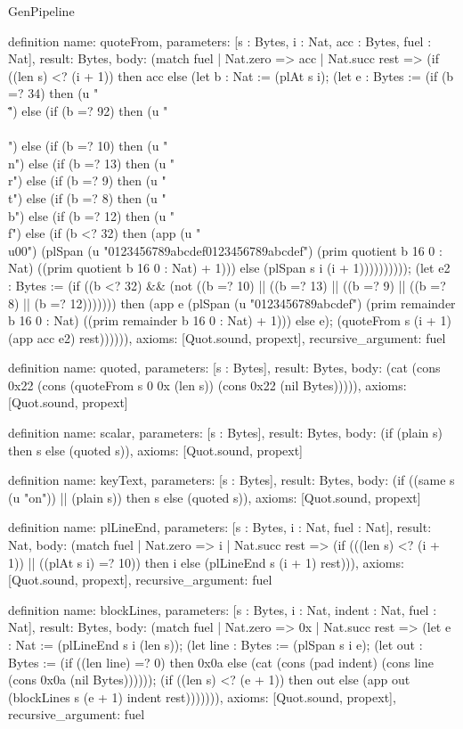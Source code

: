 \begin{lexlean}{GenPipeline}
\begin{semanticmodule}
definition{
  name: quoteFrom,
  parameters: [s : Bytes, i : Nat, acc : Bytes, fuel : Nat],
  result: Bytes,
  body: (match fuel
    | Nat.zero => acc
    | Nat.succ rest => (if ((len s) <? (i + 1)) then acc else (let b : Nat := (plAt s i); (let e : Bytes := (if (b =? 34) then (u "\\\"") else (if (b =? 92) then (u "\\\\") else (if (b =? 10) then (u "\\n") else (if (b =? 13) then (u "\\r") else (if (b =? 9) then (u "\\t") else (if (b =? 8) then (u "\\b") else (if (b =? 12) then (u "\\f") else (if (b <? 32) then (app (u "\\u00") (plSpan (u "0123456789abcdef0123456789abcdef") (prim quotient b 16 0 : Nat) ((prim quotient b 16 0 : Nat) + 1))) else (plSpan s i (i + 1)))))))))); (let e2 : Bytes := (if ((b <? 32) && (not ((b =? 10) || ((b =? 13) || ((b =? 9) || ((b =? 8) || (b =? 12))))))) then (app e (plSpan (u "0123456789abcdef") (prim remainder b 16 0 : Nat) ((prim remainder b 16 0 : Nat) + 1))) else e); (quoteFrom s (i + 1) (app acc e2) rest)))))),
  axioms: [Quot.sound, propext],
  recursive_argument: fuel
}

definition{
  name: quoted,
  parameters: [s : Bytes],
  result: Bytes,
  body: (cat (cons 0x22 (cons (quoteFrom s 0 0x (len s)) (cons 0x22 (nil Bytes))))),
  axioms: [Quot.sound, propext]
}

definition{
  name: scalar,
  parameters: [s : Bytes],
  result: Bytes,
  body: (if (plain s) then s else (quoted s)),
  axioms: [Quot.sound, propext]
}

definition{
  name: keyText,
  parameters: [s : Bytes],
  result: Bytes,
  body: (if ((same s (u "on")) || (plain s)) then s else (quoted s)),
  axioms: [Quot.sound, propext]
}

definition{
  name: plLineEnd,
  parameters: [s : Bytes, i : Nat, fuel : Nat],
  result: Nat,
  body: (match fuel
    | Nat.zero => i
    | Nat.succ rest => (if (((len s) <? (i + 1)) || ((plAt s i) =? 10)) then i else (plLineEnd s (i + 1) rest))),
  axioms: [Quot.sound, propext],
  recursive_argument: fuel
}

definition{
  name: blockLines,
  parameters: [s : Bytes, i : Nat, indent : Nat, fuel : Nat],
  result: Bytes,
  body: (match fuel
    | Nat.zero => 0x
    | Nat.succ rest => (let e : Nat := (plLineEnd s i (len s)); (let line : Bytes := (plSpan s i e); (let out : Bytes := (if ((len line) =? 0) then 0x0a else (cat (cons (pad indent) (cons line (cons 0x0a (nil Bytes)))))); (if ((len s) <? (e + 1)) then out else (app out (blockLines s (e + 1) indent rest))))))),
  axioms: [Quot.sound, propext],
  recursive_argument: fuel
}


\end{semanticmodule}
\end{lexlean}
